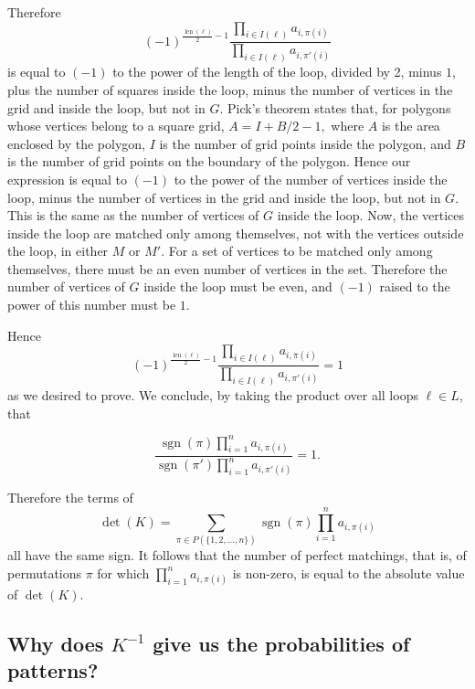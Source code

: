 \documentclass[10pt,reqno]{amsart}
\theoremstyle{plain}
\theoremstyle{definition}
\theoremstyle{remark}
\DeclareMathOperator{\sgn }{sgn }
\DeclareMathOperator{\len }{len }
\begin{document}
Therefore 
\begin{equation}
(-1)^{\frac{\len(\ell)}{2}-1} \frac{\prod_{i\in I(\ell )} a_{i,\pi(i)}}
     {\prod_{i\in I(\ell )} a_{i,\pi \prime (i)}}
\end{equation}
is equal to $(-1)$ to the power of the length of the loop, divided by 2,
minus $1$, plus the number of squares inside the loop, minus the number
of vertices in the grid and inside the loop, but not in $G$.
Pick's theorem states that, for polygons whose vertices belong to a square
grid, $A=I+B/2-1,$ where $A$ is the area enclosed by the polygon,
$I$ is the number of grid points inside the polygon, and $B$ is the
number of grid points on the boundary of the polygon. Hence 
our expression is equal to $(-1)$ to the power of the number of
vertices inside the loop, minus the number of vertices in the grid and
inside the loop, but not in $G$. This is the same as the number
of vertices of $G$ inside the loop. Now, the vertices inside the loop
are matched only among themselves, not with the vertices outside the loop,
in either $M$ or $M\prime $. For a set of vertices to be matched only among
themselves, there must be an even number of vertices in the set.
Therefore
the number of vertices of $G$ inside the loop must be even, and
$(-1)$ raised to the power of this number must be $1$. 

Hence
\begin{equation}
(-1)^{\frac{\len(\ell)}{2}-1} \frac{\prod_{i\in I(\ell )} a_{i,\pi(i)}}
     {\prod_{i\in I(\ell )} a_{i,\pi \prime (i)}} = 1
\end{equation}
as we desired to prove. We conclude, by taking the product over all loops
$\ell \in L$, that

\begin{equation}\frac{\sgn(\pi) \prod_{i=1}^n a_{i,\pi(i)}}
       {\sgn(\pi \prime) \prod_{i=1}^n a_{i,\pi \prime(i)}} = 1.\end{equation}

Therefore the terms of
\begin{equation}
\det(K) = \sum_{\pi \in P(\{1,2,...,n\})} \sgn(\pi) \prod_{i=1}^n a_{i,\pi(i)}
\end{equation}
all have the same sign. It follows that the number of perfect matchings, 
that is,
of permutations $\pi$ for which $\prod_{i=1}^n a_{i,\pi(i)}$ is non-zero,
is equal to the absolute value of $\det(K)$.

\subsection{Why does $K^{-1}$ give us the probabilities of patterns?}
\end{document}
